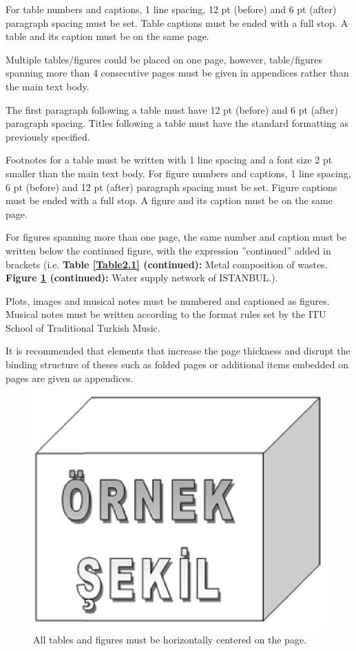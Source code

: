 For table numbers and captions, 1 line spacing, 12 pt (before) and 6 pt (after) paragraph spacing must be set. Table captions must be ended with a full stop. A table and its caption must be on the same page. 

Multiple tables/figures could be placed on one page, however, table/figures spanning more than 4 consecutive pages must be given in appendices rather than the main text body.

The first paragraph following a table must have 12 pt (before) and 6 pt (after) paragraph spacing. Titles following a table must have the standard formatting as previously specified. 

Footnotes for a table must be written with 1 line spacing and a font size 2 pt smaller than the main text body. 
For figure numbers and captions, 1 line spacing, 6 pt (before) and 12 pt (after) paragraph spacing must be set. Figure captions must be ended with a full stop. A figure and its caption must be on the same page. 

For figures spanning more than one page, the same number and caption must be written below the continued figure, with the expression ”continued” added in brackets (i.e. \textbf{Table \ref{Table2.1} (continued):} Metal composition of wastes. \textbf{Figure \ref{Figure2.1} (continued):} Water supply network of ISTANBUL.).

Plots, images and musical notes must be numbered and captioned as figures. Musical notes must be written according to the format rules set by the ITU School of Traditional Turkish Music. 

It is recommended that elements that increase the page thickness and disrupt the binding structure of theses such as  folded pages or additional items embedded on pages are given as appendices.

\vspace{6pt}
\begin{figure}[h]
	\centering
	\includegraphics[scale=.3]{./fig/sekil1}
	\vspace{6pt}
	\caption{All tables and figures must be horizontally centered on the page.}
	\label{Figure2.1}
\end{figure}

